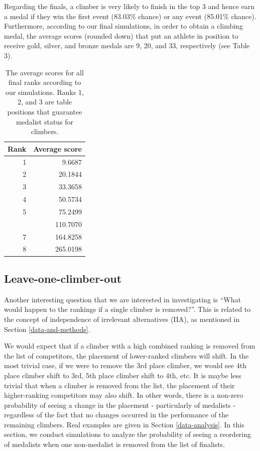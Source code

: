 \documentclass[12pt]{article}
\begin{document}
Regarding the finals, a climber is very likely to finish in the top 3
and hence earn a medal if they win the first event (83.03\% chance) or
any event (85.01\% chance). Furthermore, according to our final
simulations, in order to obtain a climbing medal, the average scores
(rounded down) that put an athlete in position to receive gold, silver,
and bronze medals are 9, 20, and 33, respectively (see Table 3).

\begin{table}

\caption{\label{tab:unnamed-chunk-7}The average scores for all final ranks according to our simulations. Ranks 1, 2, and 3 are table positions that guarantee medalist status for climbers.}
\centering
\begin{tabular}[t]{rr}
\toprule
Rank & Average score\\
\midrule
1 & 9.6687\\
2 & 20.1844\\
3 & 33.3658\\
4 & 50.5734\\
5 & 75.2499\\
\addlinespace
6 & 110.7070\\
7 & 164.8258\\
8 & 265.0198\\
\bottomrule
\end{tabular}
\end{table}

\hypertarget{leave-one-climber-out}{%
\subsection{Leave-one-climber-out}\label{leave-one-climber-out}}

Another interesting question that we are interested in investigating is
``What would happen to the rankings if a single climber is removed?''.
This is related to the concept of independence of irrelevant
alternatives (IIA), as mentioned in Section \ref{data-and-methods}.

We would expect that if a climber with a high combined ranking is
removed from the list of competitors, the placement of lower-ranked
climbers will shift. In the most trivial case, if we were to remove the
3rd place climber, we would see 4th place climber shift to 3rd, 5th
place climber shift to 4th, etc. It is maybe less trivial that when a
climber is removed from the list, the placement of their higher-ranking
competitors may also shift. In other words, there is a non-zero
probability of seeing a change in the placement - particularly of
medalists - regardless of the fact that no changes occurred in the
performance of the remaining climbers. Real examples are given in
Section \ref{data-analysis}. In this section, we conduct simulations to
analyze the probability of seeing a reordering of medalists when one
non-medalist is removed from the list of finalists.
\end{document}
